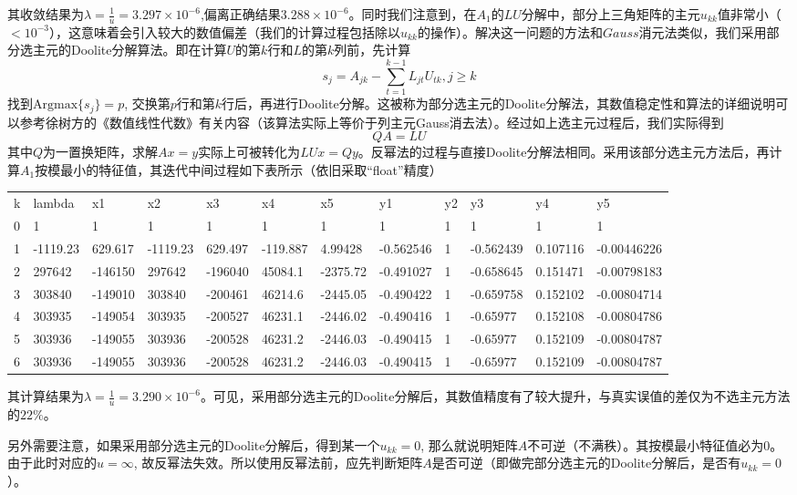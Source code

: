 \documentclass[english]{ctexart}
\providecommand{\tabularnewline}{\\}
\begin{document}
其收敛结果为$\lambda=\frac{1}{u}=3.297\times10^{-6}$,偏离正确结果$3.288\times10^{-6}$。同时我们注意到，在$A_{1}$的$LU$分解中，部分上三角矩阵的主元$u_{kk}$值非常小（$<10^{-3}$），这意味着会引入较大的数值偏差（我们的计算过程包括除以$u_{kk}$的操作）。解决这一问题的方法和$Gauss$消元法类似，我们采用部分选主元的Doolite分解算法。即在计算$U$的第$k$行和$L$的第$k$列前，先计算
\begin{equation}
s_{j}=A_{jk}-\sum_{t=1}^{k-1}L_{jt}U_{tk},j\geq k
\end{equation}
找到$\mathrm{Argmax}\{s_{j}\}=p$, 交换第$p$行和第$k$行后，再进行Doolite分解。这被称为部分选主元的Doolite分解法，其数值稳定性和算法的详细说明可以参考徐树方的《数值线性代数》有关内容（该算法实际上等价于列主元Gauss消去法）。经过如上选主元过程后，我们实际得到
\begin{equation}
QA=LU
\end{equation}
其中$Q$为一置换矩阵，求解$Ax=y$实际上可被转化为$LUx=Qy$。反幂法的过程与直接Doolite分解法相同。采用该部分选主元方法后，再计算$A_{1}$按模最小的特征值，其迭代中间过程如下表所示（依旧采取“float”精度）

\begin{tabular}{llllllllllll}
k & lambda & x1 & x2 & x3 & x4 & x5 & y1 & y2 & y3 & y4 & y5\tabularnewline
0 & 1 & 1 & 1 & 1 & 1 & 1 & 1 & 1 & 1 & 1 & 1\tabularnewline
1 & -1119.23 & 629.617 & -1119.23 & 629.497 & -119.887 & 4.99428 & -0.562546 & 1 & -0.562439 & 0.107116 & -0.00446226\tabularnewline
2 & 297642 & -146150 & 297642 & -196040 & 45084.1 & -2375.72 & -0.491027 & 1 & -0.658645 & 0.151471 & -0.00798183\tabularnewline
3 & 303840 & -149010 & 303840 & -200461 & 46214.6 & -2445.05 & -0.490422 & 1 & -0.659758 & 0.152102 & -0.00804714\tabularnewline
4 & 303935 & -149054 & 303935 & -200527 & 46231.1 & -2446.02 & -0.490416 & 1 & -0.65977 & 0.152108 & -0.00804786\tabularnewline
5 & 303936 & -149055 & 303936 & -200528 & 46231.2 & -2446.03 & -0.490415 & 1 & -0.65977 & 0.152109 & -0.00804787\tabularnewline
6 & 303936 & -149055 & 303936 & -200528 & 46231.2 & -2446.03 & -0.490415 & 1 & -0.65977 & 0.152109 & -0.00804787\tabularnewline
\end{tabular}

其计算结果为$\lambda=\frac{1}{u}=3.290\times10^{-6}$。可见，采用部分选主元的Doolite分解后，其数值精度有了较大提升，与真实误值的差仅为不选主元方法的$22\%$。

另外需要注意，如果采用部分选主元的Doolite分解后，得到某一个$u_{kk}=0$, 那么就说明矩阵$A$不可逆（不满秩）。其按模最小特征值必为$0$。由于此时对应的$u=\infty$,
故反幂法失效。所以使用反幂法前，应先判断矩阵$A$是否可逆（即做完部分选主元的Doolite分解后，是否有$u_{kk}=0$）。
\end{document}
